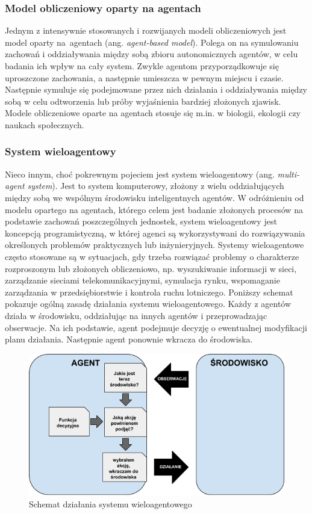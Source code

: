 \subsubsection{Model obliczeniowy oparty na agentach}
Jednym z intensywnie stosowanych i rozwijanych modeli obliczeniowych jest model oparty na~agentach (ang. \textit{agent-based model}).
Polega on na symulowaniu zachowań i oddziaływania między sobą zbioru autonomicznych agentów, w celu badania ich wpływ na cały system\cite{agent-based}. Zwykle agentom przyporządkowuje się uproszczone zachowania, a następnie umieszcza w pewnym miejscu i czasie. Następnie symuluje się podejmowane przez nich działania i oddziaływania między sobą w celu odtworzenia lub próby wyjaśnienia bardziej złożonych zjawisk. Modele obliczeniowe oparte na agentach stosuje się m.in. w biologii, ekologii czy naukach społecznych.
\subsubsection{System wieloagentowy}
    Nieco innym, choć pokrewnym pojeciem jest system wieloagentowy (ang. \textit{multi-agent system}). Jest to system komputerowy, złożony z wielu oddziałujących między sobą we wspólnym środowisku inteligentnych agentów. W odróżnieniu od modelu opartego na agentach, którego celem jest badanie złożonych procesów na podstawie zachowań poszczególnych jednostek, system wieloagentowy jest koncepcją programistyczną, w której agenci są wykorzystywani do rozwiązywania określonych problemów praktycznych lub inżynieryjnych. Systemy wieloagentowe często stosowane są w sytuacjach, gdy trzeba rozwiązać problemy o charakterze rozproszonym lub złożonych obliczeniowo, np. wyszukiwanie informacji w sieci, zarządzanie sieciami telekomunikacyjnymi, symulacja rynku, wspomaganie zarządzania w przedsiębiorstwie i kontrola ruchu lotniczego\cite{wiki-agent}. Poniższy schemat pokazuje ogólną zasadę działania systemu wieloagentowego. Każdy z agentów działa w środowisku, oddziałując na innych agentów i przeprowadzając obserwacje. Na ich podstawie, agent podejmuje decyzję o ewentualnej modyfikacji planu działania. Następnie agent ponownie wkracza do środowiska.
    \begin{figure}[h]
        \caption{Schemat działania systemu wieloagentowego}
        \includegraphics[width=\textwidth]{images/multi-agent.png}
    \end{figure}
